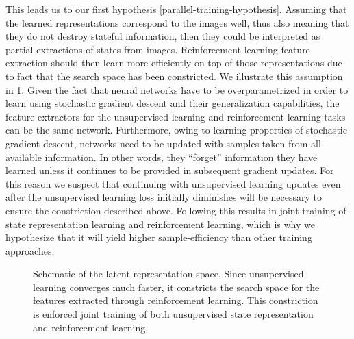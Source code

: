 This leads us to our first hypothesis \ref{parallel-training-hypothesis}.
Assuming that the learned representations correspond to the images well,
thus also meaning that they do not destroy stateful information,
then they could be interpreted as partial extractions of states from images.
Reinforcement learning feature extraction should then learn more efficiently on top of those representations
due to fact that the search space has been constricted.
We illustrate this assumption in \ref{fig-rl-srl-features-space}.
Given the fact that neural networks have to be overparametrized in order to learn
using stochastic gradient descent and their generalization capabilities,
the feature extractors for the unsupervised learning and reinforcement learning tasks
can be the same network.
Furthermore, owing to learning properties of stochastic gradient descent,
networks need to be updated with samples taken from all available information.
In other words, they ``forget'' information they have learned unless it continues 
to be provided in subsequent gradient updates.
For this reason we suspect that continuing with unsupervised learning updates
even after the unsupervised learning loss initially diminishes
will be necessary to ensure the constriction described above.
Following this results in joint training of state representation learning
and reinforcement learning, which is why we hypothesize that it will yield higher
sample-efficiency than other training approaches.




\begin{figure}[htpb]
\begin{center}

\def\setA{(1.0,0) circle (2)}%
\def\setB{(2.7,0) circle (1.5)}%
\def\boundb{(-5,3) rectangle (9,-3)}%
\end{center}
\caption{Schematic of the latent representation space. Since unsupervised learning
		converges much faster, it constricts the search space for the features extracted through reinforcement learning.
		This constriction is enforced joint training
of both unsupervised state representation and reinforcement learning.}
\label{fig-rl-srl-features-space}
\end{figure}

